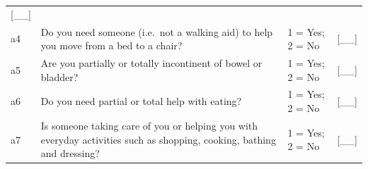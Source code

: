 \documentclass[12pt,a4paper]{book}
\theoremstyle{definition}
\theoremstyle{definition}
\theoremstyle{definition}
\theoremstyle{remark}
\begin{document}
\begin{longtable}[]{@{}llll@{}}
\begin{minipage}[t]{0.13\columnwidth}
{[}\_\_{]}\strut
\end{minipage}\tabularnewline
\begin{minipage}[t]{0.09\columnwidth}\raggedright
a4\strut
\end{minipage} & \begin{minipage}[t]{0.41\columnwidth}\raggedright
Do you need someone (i.e.~not a walking aid) to help you move from a bed
to a chair?\strut
\end{minipage} & \begin{minipage}[t]{0.25\columnwidth}\raggedright
1 = Yes; 2 = No\strut
\end{minipage} & \begin{minipage}[t]{0.13\columnwidth}\raggedright
{[}\_\_{]}\strut
\end{minipage}\tabularnewline
\begin{minipage}[t]{0.09\columnwidth}\raggedright
a5\strut
\end{minipage} & \begin{minipage}[t]{0.41\columnwidth}\raggedright
Are you partially or totally incontinent of bowel or bladder?\strut
\end{minipage} & \begin{minipage}[t]{0.25\columnwidth}\raggedright
1 = Yes; 2 = No\strut
\end{minipage} & \begin{minipage}[t]{0.13\columnwidth}\raggedright
{[}\_\_{]}\strut
\end{minipage}\tabularnewline
\begin{minipage}[t]{0.09\columnwidth}\raggedright
a6\strut
\end{minipage} & \begin{minipage}[t]{0.41\columnwidth}\raggedright
Do you need partial or total help with eating?\strut
\end{minipage} & \begin{minipage}[t]{0.25\columnwidth}\raggedright
1 = Yes; 2 = No\strut
\end{minipage} & \begin{minipage}[t]{0.13\columnwidth}\raggedright
{[}\_\_{]}\strut
\end{minipage}\tabularnewline
\begin{minipage}[t]{0.09\columnwidth}\raggedright
a7\strut
\end{minipage} & \begin{minipage}[t]{0.41\columnwidth}\raggedright
Is someone taking care of you or helping you with everyday activities
such as shopping, cooking, bathing and dressing?\strut
\end{minipage} & \begin{minipage}[t]{0.25\columnwidth}\raggedright
1 = Yes; 2 = No\strut
\end{minipage} & \begin{minipage}[t]{0.13\columnwidth}\raggedright
{[}\_\_{]}\strut
\end{minipage}\tabularnewline
\bottomrule
\end{longtable}
\end{document}
